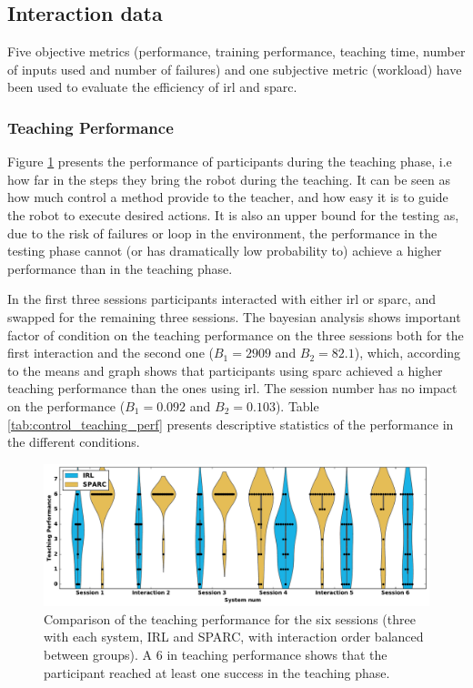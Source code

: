 \subsection{Interaction data}

Five objective metrics (performance, training performance, teaching time, number of inputs used and number of failures) and one subjective metric (workload) have been used to evaluate the efficiency of \gls{irl} and \gls{sparc}. 

\subsubsection{Teaching Performance}

Figure \ref{fig:control_teaching_performance} presents the performance of participants during the teaching phase, i.e how far in the steps they bring the robot during the teaching. It can be seen as how much control a method provide to the teacher, and how easy it is to guide the robot to execute desired actions. It is also an upper bound for the testing as, due to the risk of failures or loop in the environment, the performance in the testing phase cannot (or has dramatically low probability to) achieve a higher performance than in the teaching phase.

In the first three sessions participants interacted with either \gls{irl} or \gls{sparc}, and swapped for the remaining three sessions. The bayesian analysis shows important factor of condition on the teaching performance on the three sessions both for the first interaction and the second one ($B_1=2909$ and $B_2 = 82.1$), which, according to the means and graph shows that participants using \gls{sparc} achieved a higher teaching performance than the ones using \gls{irl}. The session number has no impact on the performance ($B_1=0.092$ and $B_2=0.103$). Table \ref{tab:control_teaching_perf} presents descriptive statistics of the performance in the different conditions.


\begin{figure}[ht]
	\includegraphics[width=\textwidth]{teaching_performance.pdf}
	\centering
	\caption{Comparison of the teaching performance for the six sessions (three with each system, IRL and SPARC, with interaction order balanced between groups). A 6 in teaching performance shows that the participant reached at least one success in the teaching phase.
	}
	\label{fig:control_teaching_performance}
\end{figure}

